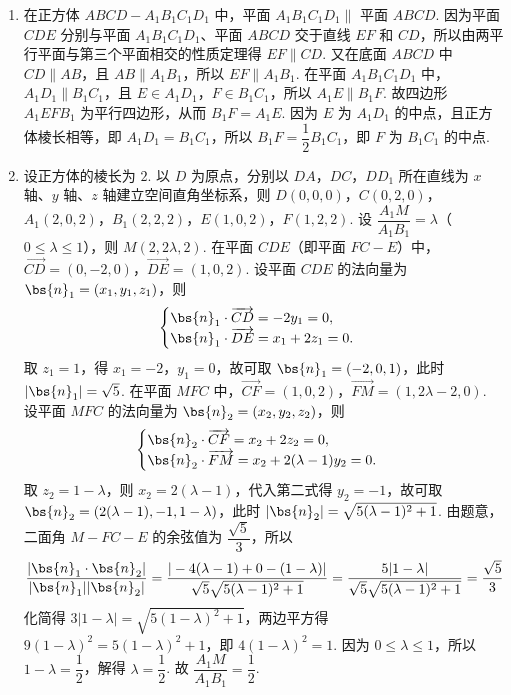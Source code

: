 \begin{solution}
\begin{enumerate}
    \item 在正方体 \(ABCD-A_1B_1C_1D_1\) 中，平面 \(A_1B_1C_1D_1\parallel\) 平面 \(ABCD\).
因为平面 \(CDE\) 分别与平面 \(A_1B_1C_1D_1\)、平面 \(ABCD\) 交于直线 \(EF\) 和 \(CD\)，所以由两平行平面与第三个平面相交的性质定理得 \(EF\parallel CD\).
又在底面 \(ABCD\) 中 \(CD\parallel AB\)，且 \(AB\parallel A_1B_1\)，所以 \(EF\parallel A_1B_1\).
在平面 \(A_1B_1C_1D_1\) 中，\(A_1D_1\parallel B_1C_1\)，且 \(E\in A_1D_1\)，\(F\in B_1C_1\)，所以 \(A_1E\parallel B_1F\).
故四边形 \(A_1EFB_1\) 为平行四边形，从而 \(B_1F=A_1E\).
因为 \(E\) 为 \(A_1D_1\) 的中点，且正方体棱长相等，即 \(A_1D_1=B_1C_1\)，所以 \(B_1F=\dfrac12 B_1C_1\)，即 \(F\) 为 \(B_1C_1\) 的中点.
    \item 设正方体的棱长为 \(2\). 以 \(D\) 为原点，分别以 \(DA\)，\(DC\)，\(DD_1\) 所在直线为 \(x\) 轴、\(y\) 轴、\(z\) 轴建立空间直角坐标系，则
\(D(0,0,0)\)，\(C(0,2,0)\)，\(A_1(2,0,2)\)，\(B_1(2,2,2)\)，\(E(1,0,2)\)，\(F(1,2,2)\).
设 \(\dfrac{A_1M}{A_1B_1}=\lambda\)（\(0\le\lambda\le 1\)），则 \(M(2,2\lambda,2)\).
在平面 \(CDE\)（即平面 \(FC-E\)）中，\(\overrightarrow{CD}=(0,-2,0)\)，\(\overrightarrow{DE}=(1,0,2)\).
设平面 \(CDE\) 的法向量为 \(\bs{n}_1=(x_1,y_1,z_1)\)，则
\[
\begin{cases}
\bs{n}_1\cdot\overrightarrow{CD}=-2y_1=0,\\
\bs{n}_1\cdot\overrightarrow{DE}=x_1+2z_1=0.
\end{cases}
\]
取 \(z_1=1\)，得 \(x_1=-2\)，\(y_1=0\)，故可取 \(\bs{n}_1=(-2,0,1)\)，此时 \(|\bs{n}_1|=\sqrt5\).
在平面 \(MFC\) 中，\(\overrightarrow{CF}=(1,0,2)\)，\(\overrightarrow{FM}=(1,2\lambda-2,0)\).
设平面 \(MFC\) 的法向量为 \(\bs{n}_2=(x_2,y_2,z_2)\)，则
\[
\begin{cases}
\bs{n}_2\cdot\overrightarrow{CF}=x_2+2z_2=0,\\
\bs{n}_2\cdot\overrightarrow{FM}=x_2+2(\lambda-1)y_2=0.
\end{cases}
\]
取 \(z_2=1-\lambda\)，则 \(x_2=2(\lambda-1)\)，代入第二式得 \(y_2=-1\)，故可取 \(\bs{n}_2=(2(\lambda-1),-1,1-\lambda)\)，此时 \(|\bs{n}_2|=\sqrt{5(\lambda-1)^2+1}\).
由题意，二面角 \(M-FC-E\) 的余弦值为 \(\dfrac{\sqrt5}{3}\)，所以
\[
\frac{|\bs{n}_1\cdot\bs{n}_2|}{|\bs{n}_1||\bs{n}_2|}=\frac{|-4(\lambda-1)+0-(1-\lambda)|}{\sqrt5\sqrt{5(\lambda-1)^2+1}}=\frac{5|1-\lambda|}{\sqrt5\sqrt{5(\lambda-1)^2+1}}=\frac{\sqrt5}{3}
\]
化简得 \(3|1-\lambda|=\sqrt{5(1-\lambda)^2+1}\)，两边平方得 \(9(1-\lambda)^2=5(1-\lambda)^2+1\)，即 \(4(1-\lambda)^2=1\).
因为 \(0\le\lambda\le 1\)，所以 \(1-\lambda=\dfrac12\)，解得 \(\lambda=\dfrac12\).
故 \(\dfrac{A_1M}{A_1B_1}=\dfrac12\).
\end{enumerate}
\end{solution}

